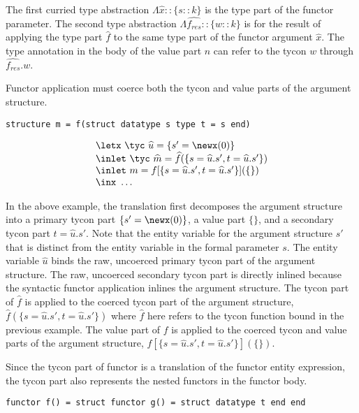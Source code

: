 The first curried type abstraction $\Lambda\widehat{x}::\{s::k\}$ is
the type part of the functor parameter. The second type
abstraction $\Lambda \widehat{f_{res}}::\{ w :: k \}$ is for the
result of applying the type part $\widehat{f}$ to the same type part
of the functor argument $\widehat{x}$. The type annotation in the
body of the value part $n$ can refer to the tycon $w$ through
$\widehat{f_{res}}.w$. 
 
Functor application must coerce both the tycon and value parts
of the argument structure. 

\begin{lstlisting}
structure m = f(struct datatype s type t = s end)
\end{lstlisting}

\[\begin{array}{l}
  \letx~\tyc~\widehat{u} = \{s'=\newx(0) \}\\
  \inlet~\tyc~\widehat{m} = \widehat{f}(\{s = \widehat{u}.s', t =
  \widehat{u}.s' \})\\
  \inlet~m = f[\{s = \widehat{u}.s', t =
  \widehat{u}.s'\}](\{ \})\\
  \inx~\ldots
 \end{array}\]

In the above example, the translation first decomposes the argument
structure into a
primary tycon part $\{s'=\newx(0)\}$, a value part $\{ \}$, and a
secondary tycon part $t = \widehat{u}.s'$. Note that the entity
variable for the argument structure $s'$ that is distinct from
the entity variable in the formal parameter $s$. The entity
variable $\widehat{u}$ binds the raw, uncoerced primary tycon part of the
argument structure. The raw, uncoerced secondary tycon part is
directly inlined because the syntactic functor application inlines the
argument structure. The tycon part of $\widehat{f}$ is applied to the coerced
tycon part of the argument structure, $\widehat{f}(\{s=\widehat{u}.s',
t=\widehat{u}.s'\})$ where $\widehat{f}$ here refers to the tycon
function bound in the previous example. The value part of $f$ is
applied to the coerced tycon and value parts of the argument
structure, $f[\{s=\widehat{u}.s',t=\widehat{u}.s'\}]
(\{\})$.

Since the tycon part of functor is a translation of the functor entity
expression, the tycon part also represents the nested functors in the
functor body. 

\begin{lstlisting}
functor f() = struct functor g() = struct datatype t end end
\end{lstlisting}

